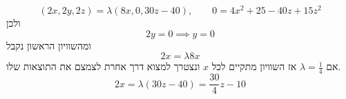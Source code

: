 



\[
	(2x, 2y, 2z) = \lambda (8x, 0, 30z - 40),
	\qquad
	0 = 4x^2 + 25 - 40z + 15z^2
\]
ולכן
\[
	2y = 0 \implies y = 0
\]
ומהשוויון הראשון נקבל
\[
	2x = \lambda 8 x
\]
אם $\lambda = \frac{1}{4}$ אז השוויון מתקיים לכל $x$ ונצטרך למצוא דרך אחרת לצמצם את התוצאות שלו.
\[
	2x = \lambda (30z - 40) = \frac{30}{4}z - 10
\]


